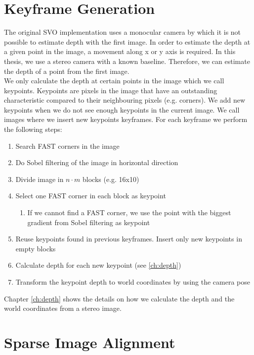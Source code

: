 \documentclass[11pt,a4paper,titlepage,oneside]{report}
\begin{document}
\section{Keyframe Generation}\label{sec:initialization}
The original SVO implementation uses a monocular camera by which it is not possible to estimate depth with the first image. In order to estimate the depth at a given point in the image, a movement along x or y axis is required. In this thesis, we use a stereo camera with a known baseline. Therefore, we can estimate the depth of a point from the first image.\\
We only calculate the depth at certain points in the image which we call keypoints. Keypoints are pixels in the image that have an outstanding characteristic compared to their neighbouring pixels (e.g. corners). We add new keypoints when we do not see enough keypoints in the current image. We call images where we insert new keypoints keyframes. For each keyframe we perform the following steps:
\begin{enumerate}
  \item{Search FAST corners in the image \cite{fast}}
  \item{Do Sobel \cite{digimproc} filtering of the image in horizontal direction}
  \item{Divide image in $n \cdot m$ blocks (e.g. 16x10)}
  \item{Select one FAST corner in each block as keypoint}
    \begin{enumerate}
      \item{If we cannot find a FAST corner, we use the point with the biggest gradient from Sobel filtering as keypoint}
    \end{enumerate}
  \item{Reuse keypoints found in previous keyframes. Insert only new keypoints in empty blocks}
  \item{Calculate depth for each new keypoint (see \ref{ch:depth})}
  \item{Transform the keypoint depth to world coordinates by using the camera pose}
\end{enumerate}

Chapter \ref{ch:depth} shows the details on how we calculate the depth and the world coordinates from a stereo image.

\section{Sparse Image Alignment}\label{sec:sia}
\end{document}

